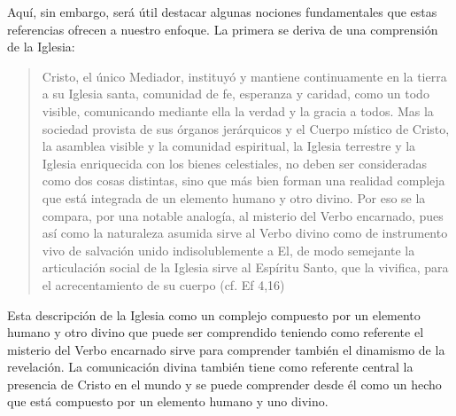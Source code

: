 Aquí, sin embargo, será útil destacar algunas nociones fundamentales que estas referencias ofrecen a nuestro enfoque. La primera se deriva de una comprensión de la Iglesia: \blockquote[][\,(LG 8)]{Cristo, el único Mediador, instituyó y mantiene continuamente en la tierra a su Iglesia santa, comunidad de fe, esperanza y caridad, como un todo visible, comunicando mediante ella la verdad y la gracia a todos. Mas la sociedad provista de sus órganos jerárquicos y el Cuerpo místico de Cristo, la asamblea visible y la comunidad espiritual, la Iglesia terrestre y la Iglesia enriquecida con los bienes celestiales, no deben ser consideradas como dos cosas distintas, sino que más bien forman una realidad compleja que está integrada de un elemento humano y otro divino. Por eso se la compara, por una notable analogía, al misterio del Verbo encarnado, pues así como la naturaleza asumida sirve al Verbo divino como de instrumento vivo de salvación unido indisolublemente a El, de modo semejante la articulación social de la Iglesia sirve al Espíritu Santo, que la vivifica, para el acrecentamiento de su cuerpo (cf. Ef 4,16)}.
Esta descripción de la Iglesia como un complejo compuesto por un elemento humano y otro divino que puede ser comprendido teniendo como referente el misterio del Verbo encarnado sirve para comprender también el dinamismo de la revelación. La comunicación divina también tiene como referente central la presencia de Cristo en el mundo y se puede comprender desde él como un hecho que está compuesto por un elemento humano y uno divino.

